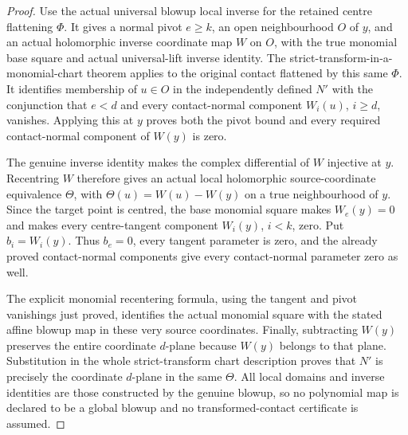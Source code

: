 \begin{proof}
Use the actual universal blowup local inverse for the retained centre flattening $\Phi$. It gives a normal pivot $e\ge k$, an open neighbourhood $O$ of $y$, and an actual holomorphic inverse coordinate map $W$ on $O$, with the true monomial base square and actual universal-lift inverse identity. The strict-transform-in-a-monomial-chart theorem applies to the original contact flattened by this same $\Phi$. It identifies membership of $u\in O$ in the independently defined $N'$ with the conjunction that $e<d$ and every contact-normal component $W_i(u)$, $i\ge d$, vanishes. Applying this at $y$ proves both the pivot bound and every required contact-normal component of $W(y)$ is zero.

The genuine inverse identity makes the complex differential of $W$ injective at $y$. Recentring $W$ therefore gives an actual local holomorphic source-coordinate equivalence $\Theta$, with $\Theta(u)=W(u)-W(y)$ on a true neighbourhood of $y$. Since the target point is centred, the base monomial square makes $W_e(y)=0$ and makes every centre-tangent component $W_i(y)$, $i<k$, zero. Put $b_i=W_i(y)$. Thus $b_e=0$, every tangent parameter is zero, and the already proved contact-normal components give every contact-normal parameter zero as well.

The explicit monomial recentering formula, using the tangent and pivot vanishings just proved, identifies the actual monomial square with the stated affine blowup map in these very source coordinates. Finally, subtracting $W(y)$ preserves the entire coordinate $d$-plane because $W(y)$ belongs to that plane. Substitution in the whole strict-transform chart description proves that $N'$ is precisely the coordinate $d$-plane in the same $\Theta$. All local domains and inverse identities are those constructed by the genuine blowup, so no polynomial map is declared to be a global blowup and no transformed-contact certificate is assumed.
\end{proof}


